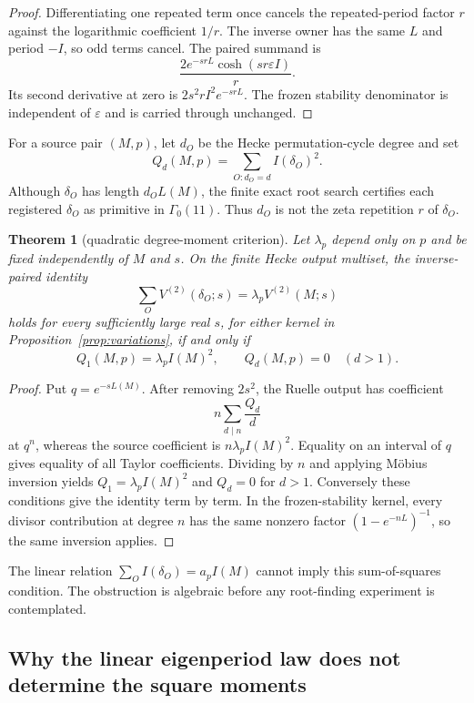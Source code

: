 \documentclass[11pt]{article}
\newtheorem{theorem}{Theorem}[section]
\theoremstyle{definition}
\theoremstyle{remark}
\newcommand{\G}{\Gamma_0(11)}
\newcommand{\e}{\varepsilon}
\begin{document}
\begin{proof}
Differentiating one repeated term once cancels the repeated-period factor $r$ against the logarithmic coefficient $1/r$. The inverse owner has the same $L$ and period $-I$, so odd terms cancel. The paired summand is
\[
\frac{2e^{-srL}\cosh(sr\e I)}r.
\]
Its second derivative at zero is $2s^2rI^2e^{-srL}$. The frozen stability denominator is independent of $\e$ and is carried through unchanged.
\end{proof}

For a source pair $(M,p)$, let $d_O$ be the Hecke permutation-cycle degree and set
\[
Q_d(M,p)=\sum_{O:d_O=d} I(\delta_O)^2.
\]
Although $\delta_O$ has length $d_OL(M)$, the finite exact root search certifies each registered $\delta_O$ as primitive in $\G$. Thus $d_O$ is not the zeta repetition $r$ of $\delta_O$.

\begin{theorem}[quadratic degree-moment criterion]\label{thm:moment}
Let $\lambda_p$ depend only on $p$ and be fixed independently of $M$ and $s$. On the finite Hecke output multiset, the inverse-paired identity
\[
\sum_O V^{(2)}(\delta_O;s)=\lambda_pV^{(2)}(M;s)
\]
holds for every sufficiently large real $s$, for either kernel in Proposition~\ref{prop:variations}, if and only if
\[
Q_1(M,p)=\lambda_p I(M)^2,
\qquad
Q_d(M,p)=0\quad(d>1).
\]
\end{theorem}

\begin{proof}
Put $q=e^{-sL(M)}$. After removing $2s^2$, the Ruelle output has coefficient
\[
n\sum_{d\mid n}\frac{Q_d}{d}
\]
at $q^n$, whereas the source coefficient is $n\lambda_pI(M)^2$. Equality on an interval of $q$ gives equality of all Taylor coefficients. Dividing by $n$ and applying M\"obius inversion yields $Q_1=\lambda_pI(M)^2$ and $Q_d=0$ for $d>1$. Conversely these conditions give the identity term by term. In the frozen-stability kernel, every divisor contribution at degree $n$ has the same nonzero factor $(1-e^{-nL})^{-1}$, so the same inversion applies.
\end{proof}

The linear relation $\sum_OI(\delta_O)=a_pI(M)$ cannot imply this sum-of-squares condition. The obstruction is algebraic before any root-finding experiment is contemplated.

\subsection{Why the linear eigenperiod law does not determine the square moments}
\end{document}
